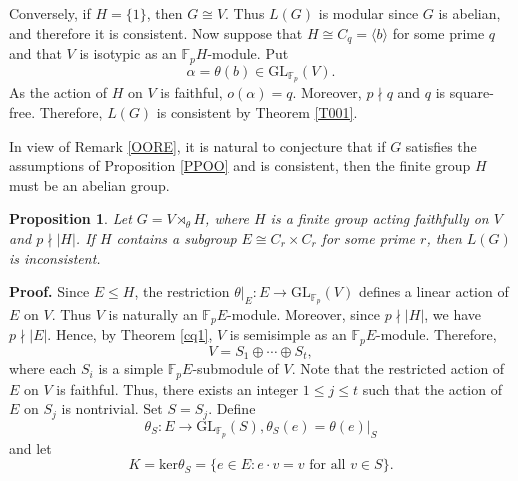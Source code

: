 \documentclass[12pt]{article}
\newtheorem{proposition}{\bf Proposition}[section]
\def\QEDopen{{\setlength{\fboxsep}{0pt}\setlength{\fboxrule}{0.2pt}\fbox{\rule[0pt]{0pt}{1.3ex}\rule[0pt]{1.3ex}{0pt}}}}
\def\QED{\QEDopen}
\def\proof{{\bf Proof.} }
\def\endproof{\hspace*{\fill}~\QED\par\endtrivlist\unskip}
\begin{document}
Conversely, if $H=\{1\}$, then $G\cong V$. Thus $L(G)$ is 
modular since $G$ is abelian, and therefore it is consistent. 
Now suppose that $H\cong C_q=\langle b\rangle$ for some prime $q$ 
and that $V$ is isotypic as an $\mathbb{F}_pH$-module. Put
$$\alpha=\theta(b)\in \mbox{GL}_{\mathbb{F}_p}(V).$$
As the action of $H$ on $V$ is faithful, $o(\alpha)=q$. Moreover, $p\nmid q$ and $q$ is square-free. Therefore, $L(G)$ is consistent by Theorem \ref{T001}.
\endproof

In view of Remark \ref{OORE}, it is natural to conjecture that if $G$ satisfies the assumptions of Proposition \ref{PPOO} and is consistent, then the finite group $H$ must be an abelian group.



\begin{proposition}\label{Propo+0}
Let $G=V\rtimes_{\theta}H$, where $H$ is a finite group acting faithfully on $V$ and
$p\nmid |H|$. If $H$ contains a subgroup $E\cong C_r\times C_r$ for some prime $r$, then $L(G)$ is inconsistent.
\end{proposition} 
\proof 
Since $E\leq H$, the restriction
$\theta|_E:E\longrightarrow \mbox{GL}_{\mathbb{F}_p}(V)$ 
defines a linear action of $E$ on $V$.
Thus $V$ is naturally an $\mathbb{F}_pE$-module.  
Moreover, since $p\nmid |H|$, we have $p\nmid |E|$. 
Hence, by Theorem \ref{cq1}, $V$ is semisimple as an $\mathbb{F}_pE$-module. 
Therefore, $$V=S_1\oplus\cdots\oplus S_t,$$ 
where each $S_i$ is a simple $\mathbb{F}_pE$-submodule of $V$. 
Note that the restricted action of $E$ on $V$ is faithful. 
Thus, there exists an integer $1\leq j\leq t$ such that 
the action of $E$ on $S_j$ is nontrivial.
Set $S=S_j$. Define 
$$\theta_S: E\longrightarrow \mbox{GL}_{\mathbb{F}_p}(S), \theta_S(e)=\theta(e)|_S$$
and let $$K=\mbox{ker}\theta_S=\{e\in E: e\cdot v=v \mbox{ for all } v\in S\}.$$
\end{document}
